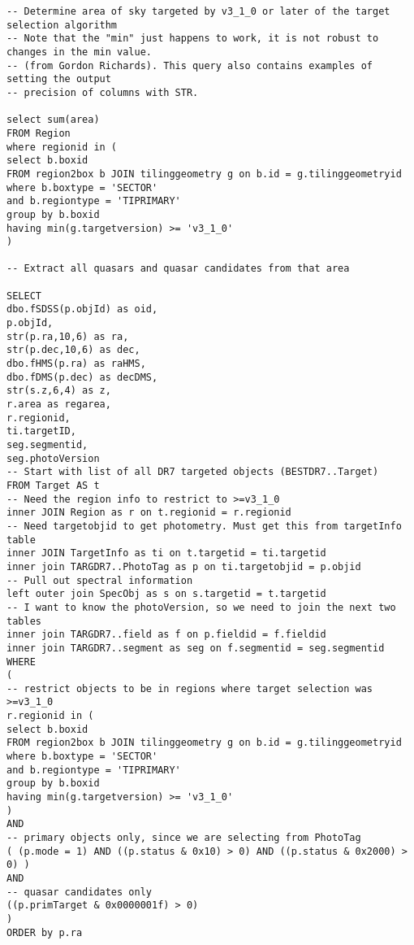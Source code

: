 \documentclass[11pt,a4paper]{article}
\begin{document}
\begin{lstlisting}
-- Determine area of sky targeted by v3_1_0 or later of the target selection algorithm 
-- Note that the "min" just happens to work, it is not robust to changes in the min value.
-- (from Gordon Richards). This query also contains examples of setting the output 
-- precision of columns with STR. 

select sum(area) 
FROM Region 
where regionid in (
select b.boxid
FROM region2box b JOIN tilinggeometry g on b.id = g.tilinggeometryid
where b.boxtype = 'SECTOR'
and b.regiontype = 'TIPRIMARY'
group by b.boxid
having min(g.targetversion) >= 'v3_1_0' 
) 

-- Extract all quasars and quasar candidates from that area 

SELECT
dbo.fSDSS(p.objId) as oid,
p.objId,
str(p.ra,10,6) as ra,
str(p.dec,10,6) as dec,
dbo.fHMS(p.ra) as raHMS,
dbo.fDMS(p.dec) as decDMS,
str(s.z,6,4) as z,
r.area as regarea,
r.regionid,
ti.targetID,
seg.segmentid,
seg.photoVersion
-- Start with list of all DR7 targeted objects (BESTDR7..Target) 
FROM Target AS t
-- Need the region info to restrict to >=v3_1_0
inner JOIN Region as r on t.regionid = r.regionid
-- Need targetobjid to get photometry. Must get this from targetInfo table
inner JOIN TargetInfo as ti on t.targetid = ti.targetid
inner join TARGDR7..PhotoTag as p on ti.targetobjid = p.objid
-- Pull out spectral information
left outer join SpecObj as s on s.targetid = t.targetid
-- I want to know the photoVersion, so we need to join the next two tables
inner join TARGDR7..field as f on p.fieldid = f.fieldid
inner join TARGDR7..segment as seg on f.segmentid = seg.segmentid 
WHERE 
(
-- restrict objects to be in regions where target selection was >=v3_1_0
r.regionid in (
select b.boxid
FROM region2box b JOIN tilinggeometry g on b.id = g.tilinggeometryid
where b.boxtype = 'SECTOR'
and b.regiontype = 'TIPRIMARY'
group by b.boxid
having min(g.targetversion) >= 'v3_1_0'
)
AND
-- primary objects only, since we are selecting from PhotoTag
( (p.mode = 1) AND ((p.status & 0x10) > 0) AND ((p.status & 0x2000) > 0) )
AND
-- quasar candidates only
((p.primTarget & 0x0000001f) > 0) 
) 
ORDER by p.ra 
\end{lstlisting}
\end{document}
